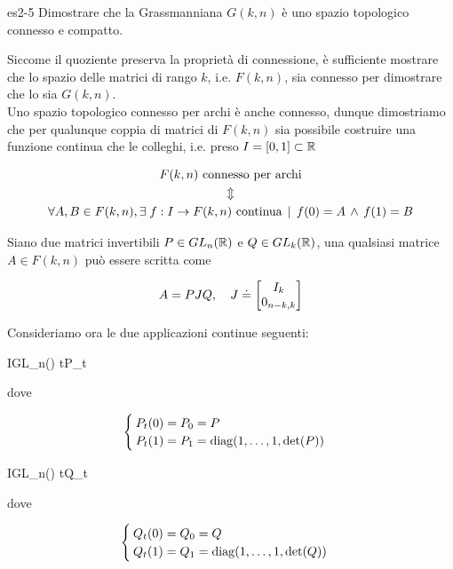 {es2-5}
{
Dimostrare che la Grassmanniana $ G(k,n) $ è uno spazio topologico connesso e compatto.
}
{
Siccome il quoziente preserva la proprietà di connessione, è sufficiente mostrare che lo spazio delle matrici di rango $ k $, i.e. $ F(k,n) $, sia connesso per dimostrare che lo sia $ G(k,n) $. \\
Uno spazio topologico connesso per archi è anche connesso, dunque dimostriamo che per qualunque coppia di matrici di $ F(k,n) $ sia possibile costruire una funzione continua che le colleghi, i.e. preso $ I = [0,1] \subset \mathbb{R} $

\begin{gather}
	F(k,n) \text{ connesso per archi} \nonumber \\
	\Updownarrow \\
	\forall A, B \in F(k,n), \E f : I \to F(k,n) \text{ continua} %
	\, \mid \, f(0) = A \, \wedge \, f(1) = B \nonumber
\end{gather}

Siano due matrici invertibili $ P \in GL_{n}(\mathbb{R}) $ e $ Q \in GL_{k}(\mathbb{R}) $, una qualsiasi matrice $ A \in F(k,n) $ può essere scritta come

\begin{equation}
	A = P J Q \qcomma J \doteq \bmqty{I_{k} \\ 0_{n-k,k}}
\end{equation}

Consideriamo ora le due applicazioni continue seguenti:

	{I}{GL_{n}(\R)}
	{t}{P_{t}}

dove

\begin{equation}
	\begin{cases}
		P_{t}(0) = P_{0} = P \\
		P_{t}(1) = P_{1} = \operatorname{diag}(1,\dots,1,\det(P))
	\end{cases}
\end{equation}

	{I}{GL_{n}(\R)}
	{t}{Q_{t}}

dove

\begin{equation}
	\begin{cases}
		Q_{t}(0) = Q_{0} = Q \\
		Q_{t}(1) = Q_{1} = \operatorname{diag}(1,\dots,1,\det(Q))
	\end{cases}
\end{equation}

}
